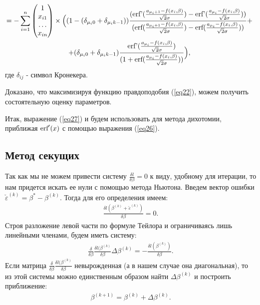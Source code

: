 \documentclass[a4paper,14pt]{extarticle}
\begin{document}
\begin{multline}
    \nonumber 
    =-\sum_{i=1}^{n}\begin{pmatrix}
        1\\
        x_{i1}\\
        \dots\\
        x_{in}
    \end{pmatrix}\times  \Big((1-(\delta_{\mu_i 0}+\delta_{\mu_i k-1}))\frac{(\textup{erf'}(\frac{a_{\mu_i+1}-f(x_i,\beta)}{\sqrt{2}\sigma})-\textup{erf'}(\frac{a_{\mu_i}-f(x_i,\beta)}{\sqrt{2}\sigma}))}{ (\textup{erf}(\frac{a_{\mu_i+1}-f(x_i,\beta)}{\sqrt{2}\sigma})-\textup{erf}(\frac{a_{\mu_i}-f(x_i,\beta)}{\sqrt{2}\sigma}))}+~\\
    +(\delta_{\mu_i 0}+\delta_{\mu_i k-1})\frac{\textup{erf'}(\frac{a_{\mu_i}-f(x_i,\beta)}{\sqrt{2}\sigma})}{(1+\textup{erf}(\frac{a_{\mu_i}-f(x_i,\beta)}{\sqrt{2}\sigma}))}\Big)  ,~
\end{multline}
где $\delta_{ij}$ - символ Кронекера.

Доказано, что максимизируя функцию правдоподобия (\ref{eq22}), можем получить состоятельную оценку\cite{OLSforGrouping} параметров.

Итак, выражение (\ref{eq27}) и будем использовать для метода дихотомии, приближая $\textup{erf}'(x)$ с помощью выражения (\ref{eq26}).

\subsection{Метод секущих}\label{sec4_2}
Так как мы не можем привести систему $ \frac{\delta l}{\delta \beta}=0$ к виду, удобному для итерации, то нам придется искать ее нули с помощью метода Ньютона.
Введем вектор ошибки $\check{\varepsilon}^{(k)}=\beta^{*}-\beta^{(k)}$. Тогда для его определения имеем:
\begin{eqnarray}
    \frac{\delta l (\beta^{(k)}+\check{\varepsilon}^{(k)})}{\delta \beta}=0.
\end{eqnarray}
Строя разложение левой части по формуле Тейлора и ограничиваясь лишь линейными членами\cite{NumericalMethods}, будем иметь систему:
\begin{eqnarray}
    \frac{\delta }{\delta \beta}\frac{\delta l (\beta^{(k)}}{\delta \beta}\Delta \beta^{(k)}=-\frac{\delta l (\beta^{(k)})}{\delta \beta}.
\end{eqnarray}
Если матрица $\frac{\delta }{\delta \beta}\frac{\delta l (\beta^{(k)}}{\delta \beta}$ невырожденная (а в нашем случае она диагональная), то из этой системы можно единственным образом найти $\Delta \beta^{(k)}$ и построить приближение:
\begin{eqnarray}
    \beta^{(k+1)}=\beta^{(k)}+\Delta \beta^{(k)}.
\end{eqnarray}
\end{document}
